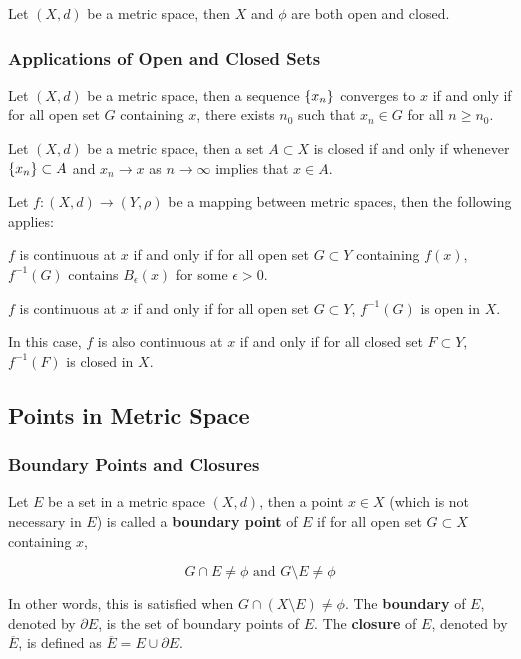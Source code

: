 \documentclass[a4paper,12pt]{article}
\begin{document}
\begin{crl}
  Let $(X,d)$ be a metric space, then $X$ and $\phi$ are both open and closed.
\end{crl}

\subsubsection{Applications of Open and Closed Sets}
\begin{pst}
  Let $(X,d)$ be a metric space, then a sequence $\left\{ x_{n}\right\}$ converges to $x$ if and only if for all open set $G$ containing $x$, there exists $n_{0}$ such that $x_{n}\in G$ for all $n\geq n_{0}$.
\end{pst}\n

\begin{pst}
  Let $(X,d)$ be a metric space, then a set $A\subset X$ is closed if and only if whenever $\left\{ x_{n}\right\}\subset A$ and $x_{n}\to x$ as $n\to\infty$ implies that $x\in A$.
\end{pst}\n

\begin{pst}
  Let $f:(X,d)\to(Y,\rho)$ be a mapping between metric spaces, then the following applies:

  \begin{alist}
    \item $f$ is continuous at $x$ if and only if for all open set $G\subset Y$ containing $f(x)$, $f^{-1}(G)$ contains $B_{\epsilon}(x)$ for some $\epsilon>0$.
    \item $f$ is continuous at $x$ if and only if for all open set $G\subset Y$, $f^{-1}(G)$ is open in $X$.
  \end{alist}
\end{pst}\n

In this case, $f$ is also continuous at $x$ if and only if for all closed set $F\subset Y$, $f^{-1}(F)$ is closed in $X$.

\propdisp
\subsection{Points in Metric Space}
\subsubsection{Boundary Points and Closures}
\begin{dft}
  Let $E$ be a set in a metric space $(X,d)$, then a point $x\in X$ (which is not necessary in $E$) is called a \textbf{boundary point} of $E$ if for all open set $G\subset X$ containing $x$,

  $$G\cap E\neq\phi\text{ and }G\setminus E\neq\phi$$\s

  In other words, this is satisfied when $G\cap(X\setminus E)\neq\phi$. The \textbf{boundary} of $E$, denoted by $\partial E$, is the set of boundary points of $E$. The \textbf{closure} of $E$, denoted by $\overline{E}$, is defined as $\overline{E}=E\cup\partial E$.
\end{dft}\n
\end{document}
